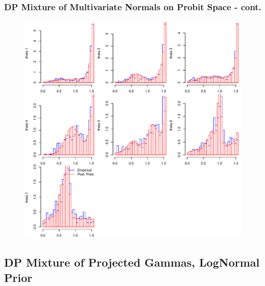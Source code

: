 \documentclass[aspectratio=169]{beamer}
\begin{document}
\begin{frame}
  \frametitle{DP Mixture of Multivariate Normals on Probit Space - cont.}
  \begin{figure}
    \centering
    \includegraphics[scale = 0.43]{./images/dpmp2_emp_v_pred_decluster}
  \end{figure}
\end{frame}

\subsection{DP Mixture of Projected Gammas, LogNormal Prior}
\end{document}
